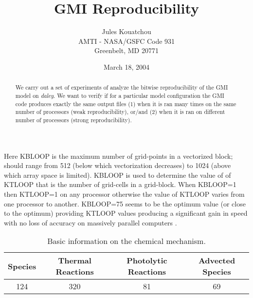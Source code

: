 %
\pagestyle{plain}
\renewcommand{\baselinestretch}{1.0} %
\textwidth15.5cm 
 \evensidemargin-4.5mm  %
\parindent 25pt


%
\title{\Large\bf GMI Reproducibility}
\author{Jules Kouatchou \\
        AMTI - NASA/GSFC Code 931 \\
        Greenbelt, MD 20771}
\date{March 18, 2004}
\maketitle

\begin{abstract}
We carry out a set of experiments of analyze the bitwise reproducibility
of the GMI model on \textit{daley}. We want to verify if for a particular
model configuration the GMI code produces exactly the same output files
(1) when it is ran many times on the same number of processors
(weak reproducibility), or/and
(2) when it is ran on different number of processors
(strong reproducibility).
\end{abstract}

Here KBLOOP is the maximum number of grid-points in a vectorized block;
should range from  512 (below which vectorization decreases) to 1024
(above which array space is limited).
KBLOOP is used to determine the value of of KTLOOP that is the number
of grid-cells in a grid-block.
When KBLOOP=1 then KTLOOP=1 on any processor otherwise the value of
KTLOOP varies from one processor to another.
KBLOOP=75 seems to be the optimum value (or close to the optimum)
providing KTLOOP values producing a significant gain in speed with no
loss of accuracy on massively parallel computers \cite{Rotman-etal01}.

\begin{table}[!h]
\begin{center}
\begin{tabular}{|c|c|c|c|} \hline\hline
 Species & Thermal Reactions & Photolytic Reactions & Advected Species \\ \hline\hline
 124 & 320 & 81 & 69 \\ \hline\hline
\end{tabular}
\caption{Basic information on the chemical mechanism.}
\label{tab:mecha}
\end{center}
\end{table}

